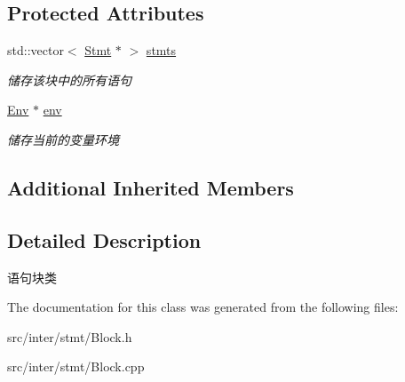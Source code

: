 \subsection*{Protected Attributes}
\begin{DoxyCompactItemize}
\item 
\mbox{\label{class_block_a88f627f956bdc80d9d697f0755130d34}} 
std\+::vector$<$ \hyperlink{class_stmt}{Stmt} $\ast$ $>$ \hyperlink{class_block_a88f627f956bdc80d9d697f0755130d34}{stmts}
\begin{DoxyCompactList}\small\item\em 储存该块中的所有语句 \end{DoxyCompactList}\item 
\mbox{\label{class_block_a85617f1e8f9f4b998e9b1ebc4c3b37c4}} 
\hyperlink{class_env}{Env} $\ast$ \hyperlink{class_block_a85617f1e8f9f4b998e9b1ebc4c3b37c4}{env}
\begin{DoxyCompactList}\small\item\em 储存当前的变量环境 \end{DoxyCompactList}\end{DoxyCompactItemize}
\subsection*{Additional Inherited Members}


\subsection{Detailed Description}
语句块类 

The documentation for this class was generated from the following files\+:\begin{DoxyCompactItemize}
\item 
src/inter/stmt/Block.\+h\item 
src/inter/stmt/Block.\+cpp\end{DoxyCompactItemize}
